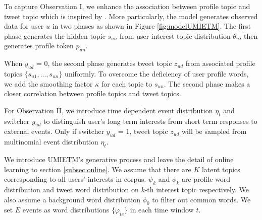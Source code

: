 \documentclass[runningheads,a4paper]{llncs}
\begin{document}
To capture Observation I, we enhance the association between profile topic and tweet topic which is inspired by \cite{blei2003modeling}. 
More particularly, the model generates observed data for user \(u\) in two phases as shown in Figure \ref{fig:modelUMIETM}. 
The first phase generates the hidden topic \(s_{un}\) from user interest topic distribution \(\theta_{u}\), then generates profile token \(p_{un}\).
 
When \(y_{ud}\) = 0, the second phase generates tweet topic \(z_{ud}\) from associated profile topics \(\{s_{u1},..., s_{un}\}\) uniformly. 
To overcome the deficiency of user profile words, we add the smoothing factor \(\kappa\) for each topic to \(s_{un}\). 
The second phase makes a closer correlation between profile topics and tweet topics. 

For Observation II, we introduce time dependent event distribution \(\eta_t\) and switcher \(y_{ud}\) to distinguish user’s long term interests from short term responses to external events. 
Only if switcher \(y_{ud}\) = 1, tweet topic \(z_{ud}\) will be sampled from multinomial event distribution \(\eta_{t}\).

We introduce UMIETM's generative process and leave the detail of online learning to section \ref{subsec:online}.
We assume that there are \(K\) latent topics corresponding to all users' interests in corpus.
\(\psi_k\) and \(\phi_k\) are profile word distribution and tweet word distribution on \(k\)-th interest topic respectively.
We also assume a background word distribution \(\phi_0\) to filter out common words.
We set \(E\) events as word distributions \(\{\varphi_{te}\}\) in each time window \(t\).
\end{document}
